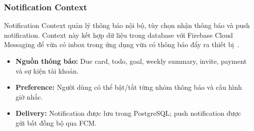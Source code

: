 \subsubsection{Notification Context}
\label{subsubsec:notification-context}

Notification Context quản lý thông báo nội bộ, tùy chọn nhận thông báo và push notification. Context này kết hợp dữ liệu trong database với Firebase Cloud Messaging để vừa có inbox trong ứng dụng vừa có thông báo đẩy ra thiết bị~\cite{firebasefcm}.

\begin{itemize}
    \item \textbf{Nguồn thông báo:} Due card, todo, goal, weekly summary, invite, payment và sự kiện tài khoản.
    \item \textbf{Preference:} Người dùng có thể bật/tắt từng nhóm thông báo và cấu hình giờ nhắc.
    \item \textbf{Delivery:} Notification được lưu trong PostgreSQL; push notification được gửi bất đồng bộ qua FCM.
\end{itemize}